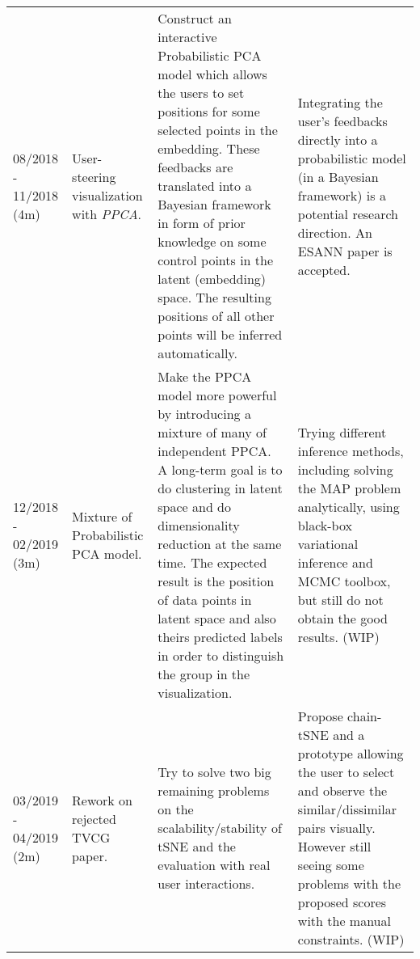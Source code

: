 \documentclass[11pt, a4paper]{article}
\begin{document}
{\begin{landscape}
\begin{longtable}{p{.07\linewidth}|p{.16\linewidth}|p{.40\linewidth}|p{.30\linewidth}}
            08/2018 - 11/2018 (4m) & User-steering visualization with \emph{PPCA}. & Construct an interactive Probabilistic PCA model which allows the users to set positions for some selected points in the embedding. These feedbacks are translated into a Bayesian framework in form of prior knowledge on some control points in the latent (embedding) space. The resulting positions of all other points will be inferred automatically. & Integrating the user's feedbacks directly into a probabilistic model (in a Bayesian framework) is a potential research direction. An ESANN paper is accepted. \\

            12/2018 - 02/2019 (3m) & Mixture of Probabilistic PCA model. & Make the PPCA model more powerful by introducing a mixture of many of independent PPCA. A long-term goal is to do clustering in latent space and do dimensionality reduction at the same time. The expected result is the position of data points in latent space and also theirs predicted labels in order to distinguish the group in the visualization. & Trying different inference methods, including solving the MAP problem analytically, using black-box variational inference and MCMC toolbox, but still do not obtain the good results. (WIP) \\
            
            03/2019 - 04/2019 (2m) & Rework on rejected TVCG paper. & Try to solve two big remaining problems on the scalability/stability of tSNE and the evaluation with real user interactions. & Propose chain-tSNE and a prototype allowing the user to select and observe the similar/dissimilar pairs visually. However still seeing some problems with the proposed scores with the manual constraints. (WIP) \\
        \end{longtable}


    \end{landscape}
    \clearpage%
} %
\end{document}
